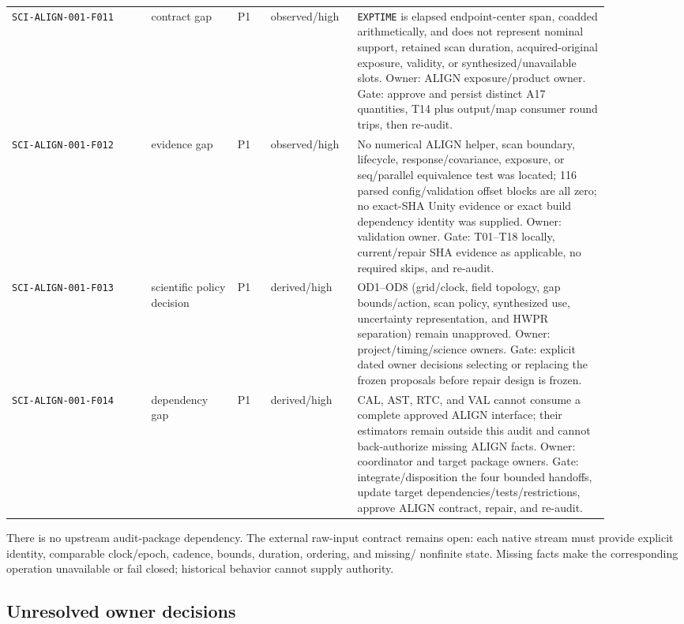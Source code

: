 \documentclass[11pt]{article}
\newcommand{\code}[1]{\nolinkurl{#1}}
\begin{document}
\begin{longtable}{L{0.21\linewidth}L{0.13\linewidth}L{0.05\linewidth}L{0.11\linewidth}L{0.385\linewidth}}
\code{SCI-ALIGN-001-F011} & contract gap & P1 & observed/high & \code{EXPTIME} is elapsed endpoint-center span, coadded arithmetically, and does not represent nominal support, retained scan duration, acquired-original exposure, validity, or synthesized/unavailable slots.  Owner: ALIGN exposure/product owner.  Gate: approve and persist distinct A17 quantities, T14 plus output/map consumer round trips, then re-audit.\\
\code{SCI-ALIGN-001-F012} & evidence gap & P1 & observed/high & No numerical ALIGN helper, scan boundary, lifecycle, response/covariance, exposure, or seq/parallel equivalence test was located; 116 parsed config/validation offset blocks are all zero; no exact-SHA Unity evidence or exact build dependency identity was supplied.  Owner: validation owner.  Gate: T01--T18 locally, current/repair SHA evidence as applicable, no required skips, and re-audit.\\
\code{SCI-ALIGN-001-F013} & scientific policy decision & P1 & derived/high & OD1--OD8 (grid/clock, field topology, gap bounds/action, scan policy, synthesized use, uncertainty representation, and HWPR separation) remain unapproved.  Owner: project/timing/science owners.  Gate: explicit dated owner decisions selecting or replacing the frozen proposals before repair design is frozen.\\
\code{SCI-ALIGN-001-F014} & dependency gap & P1 & derived/high & CAL, AST, RTC, and VAL cannot consume a complete approved ALIGN interface; their estimators remain outside this audit and cannot back-authorize missing ALIGN facts.  Owner: coordinator and target package owners.  Gate: integrate/disposition the four bounded handoffs, update target dependencies/tests/restrictions, approve ALIGN contract, repair, and re-audit.\\
\bottomrule
\end{longtable}

There is no upstream audit-package dependency.  The external raw-input
contract remains open: each native stream must provide explicit identity,
comparable clock/epoch, cadence, bounds, duration, ordering, and missing/
nonfinite state.  Missing facts make the corresponding operation unavailable
or fail closed; historical behavior cannot supply authority.

\subsection{Unresolved owner decisions}
\end{document}
